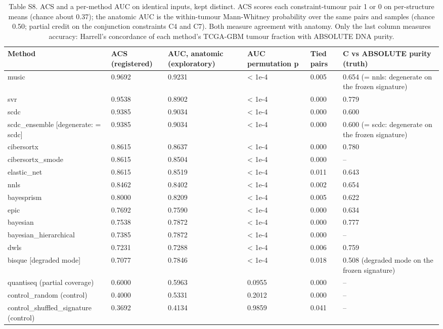 \begin{table}[htbp]
\centering
\small
\caption{Table S8. ACS and a per-method AUC on identical inputs, kept distinct. ACS scores each constraint-tumour pair 1 or 0 on per-structure means (chance about 0.37); the anatomic AUC is the within-tumour Mann-Whitney probability over the same pairs and samples (chance 0.50; partial credit on the conjunction constraints C4 and C7). Both measure agreement with anatomy. Only the last column measures accuracy: Harrell's concordance of each method's TCGA-GBM tumour fraction with ABSOLUTE DNA purity.}
\label{tab:S8_acs_vs_auc}
\begin{tabular}{llllll}
\toprule
\textbf{Method} & \textbf{ACS (registered)} & \textbf{AUC, anatomic (exploratory)} & \textbf{AUC permutation p} & \textbf{Tied pairs} & \textbf{C vs ABSOLUTE purity (truth)} \\
\midrule
music & 0.9692 & 0.9231 & < 1e-4 & 0.005 & 0.654 (= nnls: degenerate on the frozen signature) \\
svr & 0.9538 & 0.8902 & < 1e-4 & 0.000 & 0.779 \\
scdc & 0.9385 & 0.9034 & < 1e-4 & 0.000 & 0.600 \\
scdc\_ensemble [degenerate: = scdc] & 0.9385 & 0.9034 & < 1e-4 & 0.000 & 0.600 (= scdc: degenerate on the frozen signature) \\
cibersortx & 0.8615 & 0.8637 & < 1e-4 & 0.000 & 0.780 \\
cibersortx\_smode & 0.8615 & 0.8504 & < 1e-4 & 0.000 & -- \\
elastic\_net & 0.8615 & 0.8519 & < 1e-4 & 0.011 & 0.643 \\
nnls & 0.8462 & 0.8402 & < 1e-4 & 0.002 & 0.654 \\
bayesprism & 0.8000 & 0.8209 & < 1e-4 & 0.005 & 0.622 \\
epic & 0.7692 & 0.7590 & < 1e-4 & 0.000 & 0.634 \\
bayesian & 0.7538 & 0.7872 & < 1e-4 & 0.000 & 0.777 \\
bayesian\_hierarchical & 0.7385 & 0.7872 & < 1e-4 & 0.000 & -- \\
dwls & 0.7231 & 0.7288 & < 1e-4 & 0.006 & 0.759 \\
bisque [degraded mode] & 0.7077 & 0.7846 & < 1e-4 & 0.018 & 0.508 (degraded mode on the frozen signature) \\
quantiseq (partial coverage) & 0.6000 & 0.5963 & 0.0955 & 0.000 & -- \\
control\_random (control) & 0.4000 & 0.5331 & 0.2012 & 0.000 & -- \\
control\_shuffled\_signature (control) & 0.3692 & 0.4134 & 0.9859 & 0.041 & -- \\
\bottomrule
\end{tabular}
\end{table}


